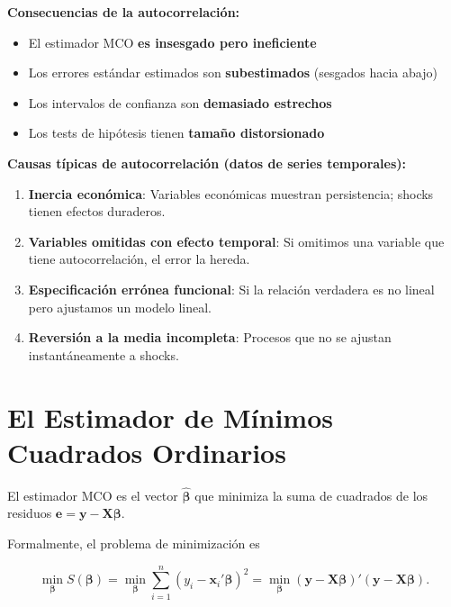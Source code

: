 \documentclass[11pt,a4paper]{article}
\begin{document}
\noindent\textbf{Consecuencias de la autocorrelación:}

\begin{itemize}
\item El estimador MCO \textbf{es insesgado pero ineficiente}
\item Los errores estándar estimados son \textbf{subestimados} (sesgados hacia abajo)
\item Los intervalos de confianza son \textbf{demasiado estrechos}
\item Los tests de hipótesis tienen \textbf{tamaño distorsionado}
\end{itemize}

\noindent\textbf{Causas típicas de autocorrelación (datos de series temporales):}

\begin{enumerate}
\item \textbf{Inercia económica}: Variables económicas muestran persistencia; shocks tienen efectos duraderos.

\item \textbf{Variables omitidas con efecto temporal}: Si omitimos una variable que tiene autocorrelación, el error la hereda.

\item \textbf{Especificación errónea funcional}: Si la relación verdadera es no lineal pero ajustamos un modelo lineal.

\item \textbf{Reversión a la media incompleta}: Procesos que no se ajustan instantáneamente a shocks.
\end{enumerate}

\section{El Estimador de Mínimos Cuadrados Ordinarios}

\begin{concepto}
El estimador MCO es el vector \(\hat{\boldsymbol{\beta}}\) que minimiza la suma de cuadrados de los residuos \(\mathbf{e} = \mathbf{y} - \mathbf{X}\boldsymbol{\beta}\).
\end{concepto}

Formalmente, el problema de minimización es

\[
\min_{\boldsymbol{\beta}} S(\boldsymbol{\beta}) = \min_{\boldsymbol{\beta}} \sum_{i=1}^{n} (y_i - \mathbf{x}_i'\boldsymbol{\beta})^2
= \min_{\boldsymbol{\beta}} (\mathbf{y} - \mathbf{X}\boldsymbol{\beta})'(\mathbf{y} - \mathbf{X}\boldsymbol{\beta}).
\]
\end{document}
